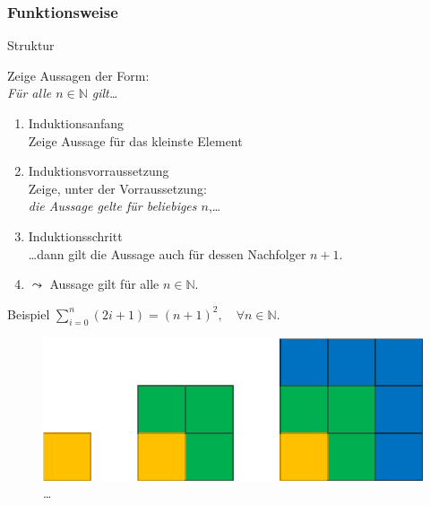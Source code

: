 \subsubsection{Funktionsweise}
\begin{frame}[fragile]{Struktur}
    \begin{alertblock}{Zeige Aussagen der Form:\\\emph{Für alle $n\in\mathbb{N}$ gilt\ldots}}
    \begin{enumerate}
        \item \alert{Induktionsanfang}\\Zeige Aussage für das kleinste Element
        \item \alert{Induktionsvorraussetzung}\\Zeige, unter der Vorraussetzung: \\\emph{die Aussage gelte für beliebiges $n$},\dots
        \item \alert{Induktionsschritt}\\\dots dann gilt die Aussage auch für dessen Nachfolger $n+1$.
        \item $\leadsto$ Aussage gilt für alle $n \in \mathbb{N}$.
    \end{enumerate}
    \end{alertblock}
\end{frame}

\begin{frame}[fragile]{Beispiel}
\center $\displaystyle\sum_{i = 0}^{n} (2i+1) = (n+1)^2,\quad\forall n \in\mathbb{N}$.
    \begin{figure}
        \centering
        \includegraphics[width=0.5\textheight]{../figures/Summe.png}\qquad \dots
    \end{figure}
\end{frame}

